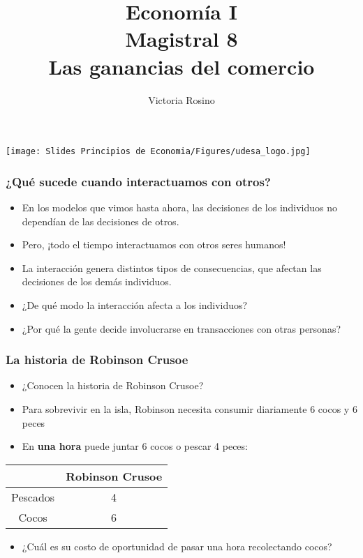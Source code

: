 \documentclass{beamer}
\title[Economía I]{Economía I \vspace{3mm}
\\ Magistral 8 \vspace{3mm} \\ Las ganancias del comercio}
\date{}
\author[Victoria Rosino]{Victoria Rosino}
\institute[]{Universidad de San Andrés}
\begin{document}
\begin{frame}
\vspace{0.3cm}
\titlepage
\centering
\vspace{-0.9cm}
\texttt{[image: Slides Principios de Economia/Figures/udesa\_logo.jpg]} 
\end{frame}

\begin{frame}
\frametitle{¿Qué sucede cuando interactuamos con otros?}
\begin{itemize}
    \item En los modelos que vimos hasta ahora, las decisiones de los individuos no dependían de las decisiones de otros.
    \item Pero, ¡todo el tiempo interactuamos con otros seres humanos!
    \item La interacción genera distintos tipos de consecuencias, que afectan las decisiones de los demás individuos.
    \item ¿De qué modo la interacción afecta a los individuos? 
    \item ¿Por qué la gente decide involucrarse en transacciones con otras personas?
\end{itemize} 
\end{frame}

\begin{frame}
\frametitle{La historia de Robinson Crusoe}
    \begin{itemize}
    \item ¿Conocen la historia de Robinson Crusoe?
    \item Para sobrevivir en la isla, Robinson necesita consumir diariamente 6 cocos y 6 peces
    \item En \textbf{una hora} puede juntar 6 cocos o pescar 4 peces:
    \end{itemize}
    
    \centering \vspace{4mm}
    \renewcommand{\arraystretch}{1.2}
    \begin{tabular}{|c|c|} \hline
    \rowcolor{blue!20} 
    & \textbf{Robinson Crusoe} \\ \hline
    Pescados   & 4  \\ \hline
    Cocos   & 6  \\ \hline     
    \end{tabular}
    
    \begin{itemize}\vspace{4mm}
    \item ¿Cuál es su costo de oportunidad de pasar una hora recolectando cocos? 
    \end{itemize}
\end{frame}
\end{document}
